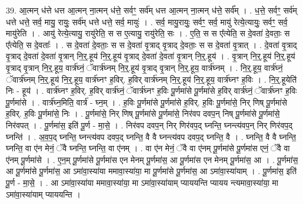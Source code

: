 \documentclass[17pt]{extarticle}
\begin{document}
39. आ॒त्मन् ध॑त्ते धत्त आ॒त्मन् ना॒त्मन् ध॑त्ते॒ सर्वꣳ॒॒ सर्व॑म् धत्त आ॒त्मन् ना॒त्मन् ध॑त्ते॒ सर्व᳚म् । . ध॒त्ते॒ सर्वꣳ॒॒ सर्व॑म् धत्ते धत्ते॒ सर्व॒ मायु॒ रायुः॒ सर्व॑म् धत्ते धत्ते॒ सर्व॒ मायुः॑ । . सर्व॒ मायु॒रायुः॒ सर्वꣳ॒॒ सर्व॒ मायु॑ रेत्ये॒त्यायुः॒ सर्वꣳ॒॒ सर्व॒ मायु॑रेति । . आयु॑ रेत्ये॒त्यायु॒ रायु॑रेति॒ स स ए॒त्यायु॒ रायु॑रेति॒ सः । . ए॒ति॒ स स ए᳚त्येति॒ स दे॒वता॑ दे॒वताः॒ स ए᳚त्येति॒ स दे॒वताः᳚ । . स दे॒वता॑ दे॒वताः॒ स स दे॒वता॑ वृ॒त्राद् वृ॒त्राद् दे॒वताः॒ स स दे॒वता॑ वृ॒त्रात् । . दे॒वता॑ वृ॒त्राद् वृ॒त्राद् दे॒वता॑ दे॒वता॑ वृ॒त्रान् नि॒र्॒.हूय॑ नि॒र्॒.हूय॑ वृ॒त्राद् दे॒वता॑ दे॒वता॑ वृ॒त्रान् नि॒र्॒.हूय॑ । . वृ॒त्रान् नि॒र्॒.हूय॑ नि॒र्॒.हूय॑ वृ॒त्राद् वृ॒त्रान् नि॒र्॒.हूय॒ वार्त्र॑घ्नं॒ ॅवार्त्र॑घ्नम् नि॒र्॒.हूय॑ वृ॒त्राद् वृ॒त्रान् नि॒र्॒.हूय॒ वार्त्र॑घ्नम् । . नि॒र्॒.हूय॒ वार्त्र॑घ्नं॒ ॅवार्त्र॑घ्नम् नि॒र्॒.हूय॑ नि॒र्॒.हूय॒ वार्त्र॑घ्नꣳ ह॒विर्. ह॒विर् वार्त्र॑घ्नम् नि॒र्॒.हूय॑ नि॒र्॒.हूय॒ वार्त्र॑घ्नꣳ ह॒विः । . नि॒र्॒.हूयेति॑ निः - हूय॑ । . वार्त्र॑घ्नꣳ ह॒विर्. ह॒विर् वार्त्र॑घ्नं॒ ॅवार्त्र॑घ्नꣳ ह॒विः पू॒र्णमा॑से पू॒र्णमा॑से ह॒विर् वार्त्र॑घ्नं॒ ॅवार्त्र॑घ्नꣳ ह॒विः पू॒र्णमा॑से । . वार्त्र॑घ्न॒मिति॒ वार्त्र॑ - घ्न॒म् । . ह॒विः पू॒र्णमा॑से पू॒र्णमा॑से ह॒विर्. ह॒विः पू॒र्णमा॑से॒ निर् णिष् पू॒र्णमा॑से ह॒विर्. ह॒विः पू॒र्णमा॑से॒ निः । . पू॒र्णमा॑से॒ निर् णिष् पू॒र्णमा॑से पू॒र्णमा॑से॒ निर॑वप दवप॒न् निष् पू॒र्णमा॑से पू॒र्णमा॑से॒ निर॑वपत् । . पू॒र्णमा॑स॒ इति॑ पू॒र्ण - मा॒से॒ । . निर॑वप दवप॒न् निर् णिर॑वप॒द् घ्नन्ति॒ घ्नन्त्य॑वप॒न् निर् णिर॑वप॒द् घ्नन्ति॑ । . अ॒व॒प॒द् घ्नन्ति॒ घ्नन्त्य॑वप दवप॒द् घ्नन्ति॒ वै वै घ्नन्त्य॑वप दवप॒द् घ्नन्ति॒ वै । . घ्नन्ति॒ वै वै घ्नन्ति॒ घ्नन्ति॒ वा ए॑न मेनं॒ ॅवै घ्नन्ति॒ घ्नन्ति॒ वा ए॑नम् । . वा ए॑न मेनं॒ ॅवै वा ए॑नम् पू॒र्णमा॑से पू॒र्णमा॑स एनं॒ ॅवै वा ए॑नम् पू॒र्णमा॑से । . ए॒न॒म् पू॒र्णमा॑से पू॒र्णमा॑स एन मेनम् पू॒र्णमा॑स॒ आ पू॒र्णमा॑स एन मेनम् पू॒र्णमा॑स॒ आ । . पू॒र्णमा॑स॒ आ पू॒र्णमा॑से पू॒र्णमा॑स॒ आ ऽमा॑वा॒स्या॑या ममावा॒स्या॑या॒ मा पू॒र्णमा॑से पू॒र्णमा॑स॒ आ ऽमा॑वा॒स्या॑याम् । . पू॒र्णमा॑स॒ इति॑ पू॒र्ण - मा॒से॒ । . आ ऽमा॑वा॒स्या॑या ममावा॒स्या॑या॒ मा ऽमा॑वा॒स्या॑याम् प्याययन्ति प्यायय न्त्यमावा॒स्या॑या॒ मा ऽमा॑वा॒स्या॑याम् प्याययन्ति । \newline
\pagebreak
{}
\end{document}
